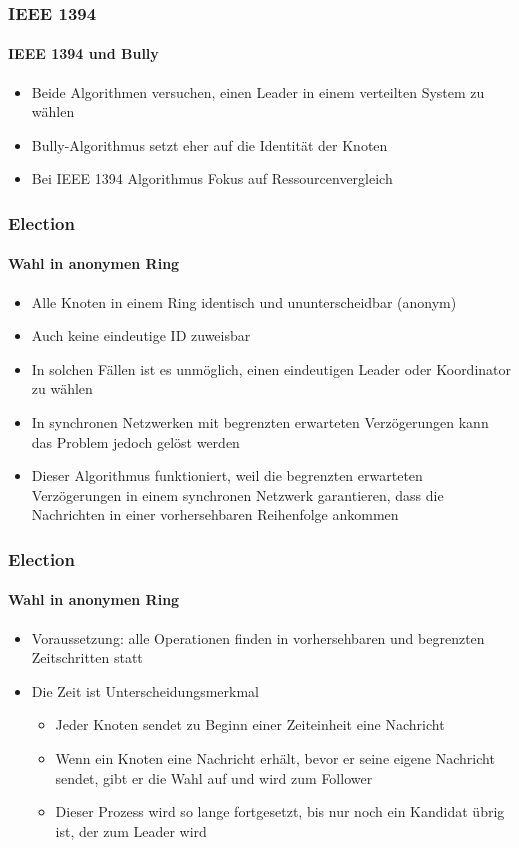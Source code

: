 \begin{frame}
  \frametitle{IEEE 1394}
  \framesubtitle{IEEE 1394 und Bully}
  \begin{itemize}
  \item  Beide Algorithmen versuchen, einen Leader in einem verteilten System zu wählen
  \item Bully-Algorithmus setzt eher auf die Identität der Knoten
  \item Bei IEEE 1394 Algorithmus Fokus auf Ressourcenvergleich
  \end{itemize}
\end{frame}

\begin{frame}
  \frametitle{Election}
  \framesubtitle{Wahl in anonymen Ring}
  \begin{itemize}
    \item Alle Knoten in einem Ring identisch und ununterscheidbar  (anonym)
    \item Auch keine eindeutige ID zuweisbar
    \item  In solchen Fällen ist es unmöglich, einen eindeutigen Leader oder Koordinator zu wählen
    \item In synchronen Netzwerken mit begrenzten erwarteten Verzögerungen kann das Problem jedoch gelöst werden
    \item Dieser Algorithmus funktioniert, weil die begrenzten erwarteten Verzögerungen in einem synchronen Netzwerk garantieren, dass die Nachrichten in einer vorhersehbaren Reihenfolge ankommen
  \end{itemize}
\end{frame}

\begin{frame}
  \frametitle{Election}
  \framesubtitle{Wahl in anonymen Ring}
  \begin{itemize}
    \item Voraussetzung: alle Operationen finden in vorhersehbaren und begrenzten Zeitschritten statt
    \item Die Zeit ist Unterscheidungsmerkmal
    \begin{itemize}
      \item  Jeder Knoten sendet zu Beginn einer Zeiteinheit eine Nachricht
      \item  Wenn ein Knoten eine Nachricht erhält, bevor er seine eigene Nachricht sendet, gibt er die Wahl auf und wird zum Follower
      \item Dieser Prozess wird so lange fortgesetzt, bis nur noch ein Kandidat übrig ist, der zum Leader wird
    \end{itemize}
  \end{itemize}
\end{frame}

